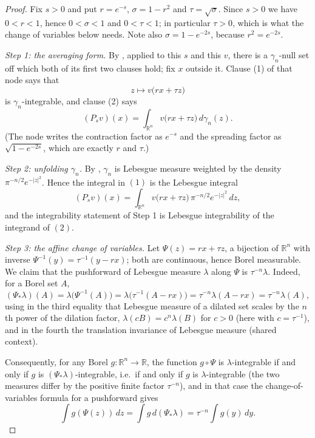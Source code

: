 \begin{proof}
Fix $s > 0$ and put $r = e^{-s}$, $\sigma = 1 - r^2$ and $\tau = \sqrt{\sigma}$.
Since $s > 0$ we have $0 < r < 1$, hence $0 < \sigma < 1$ and $0 < \tau < 1$; in
particular $\tau > 0$, which is what the change of variables below needs.  Note
also $\sigma = 1 - e^{-2s}$, because $r^2 = e^{-2s}$.

\emph{Step 1: the averaging form.}
By , applied to this $s$ and this $v$, there is a
$\gamma_n$-null set off which both of its first two clauses hold; fix $x$ outside
it.  Clause (1) of that node says that
\[
  z \longmapsto v\bigl(rx + \tau z\bigr)
\]
is $\gamma_n$-integrable, and clause (2) says
\begin{equation*}
  (P_s v)(x) = \int_{\mathbb{R}^n} v\bigl(rx + \tau z\bigr) \, d\gamma_n(z) .
  \tag{1}
\end{equation*}
(The node writes the contraction factor as $e^{-s}$ and the spreading factor as
$\sqrt{1 - e^{-2s}}$, which are exactly $r$ and $\tau$.)

\emph{Step 2: unfolding $\gamma_n$.}
By , $\gamma_n$ is Lebesgue measure weighted by the density
$\pi^{-n/2}e^{-|z|^2}$.  Hence the integral in $(1)$ is the Lebesgue integral
\begin{equation*}
  (P_s v)(x)
    = \int_{\mathbb{R}^n} v\bigl(rx+\tau z\bigr)\,
        \pi^{-n/2}e^{-|z|^2} \, dz , \tag{2}
\end{equation*}
and the integrability statement of Step 1 is Lebesgue integrability of the
integrand of $(2)$.

\emph{Step 3: the affine change of variables.}
Let $\Psi(z) = rx + \tau z$, a bijection of $\mathbb{R}^n$ with inverse
$\Psi^{-1}(y) = \tau^{-1}(y - rx)$; both are continuous, hence Borel measurable.
We claim that the pushforward of Lebesgue measure $\lambda$ along $\Psi$ is
$\tau^{-n}\lambda$.  Indeed, for a Borel set $A$,
\[
  (\Psi_*\lambda)(A) = \lambda\bigl(\Psi^{-1}(A)\bigr)
    = \lambda\bigl(\tau^{-1}(A - rx)\bigr)
    = \tau^{-n}\lambda(A - rx)
    = \tau^{-n}\lambda(A) ,
\]
using in the third equality that Lebesgue measure of a dilated set scales by the
$n$th power of the dilation factor, $\lambda(cB) = c^n\lambda(B)$ for $c > 0$
(here with $c = \tau^{-1}$), and in the fourth the translation invariance of
Lebesgue measure (shared context).

Consequently, for any Borel $g : \mathbb{R}^n \to \mathbb{R}$, the function
$g \circ \Psi$ is $\lambda$-integrable if and only if $g$ is
$(\Psi_*\lambda)$-integrable, i.e.\ if and only if $g$ is $\lambda$-integrable
(the two measures differ by the positive finite factor $\tau^{-n}$), and in that
case the change-of-variables formula for a pushforward gives
\begin{equation*}
  \int g(\Psi(z)) \, dz = \int g \, d(\Psi_*\lambda)
    = \tau^{-n}\int g(y) \, dy . \tag{3}
\end{equation*}


\end{proof}
